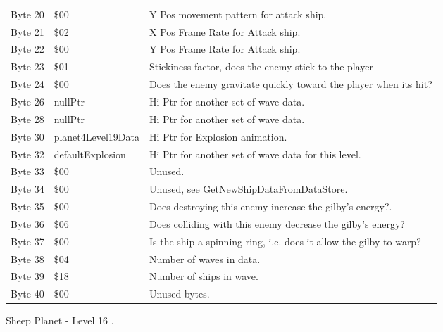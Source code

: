\begin{figure}[H]
{\begin{adjustbox}{width=12cm}
\begin{tabular}{lll}
 Byte 20 & \$00                & Y Pos movement pattern for attack ship.                            \\
 Byte 21 & \$02                & X Pos Frame Rate for Attack ship.                                  \\
 Byte 22 & \$00                & Y Pos Frame Rate for Attack ship.                                  \\
 Byte 23 & \$01                & Stickiness factor, does the enemy stick to the player              \\
 Byte 24 & \$00                & Does the enemy gravitate quickly toward the player when its hit?   \\
 Byte 26 & nullPtr            & Hi Ptr for another set of wave data.                               \\
 Byte 28 & nullPtr            & Hi Ptr for another set of wave data.                               \\
 Byte 30 & planet4Level19Data & Hi Ptr for Explosion animation.                                    \\
 Byte 32 & defaultExplosion   & Hi Ptr for another set of wave data for this level.                \\
 Byte 33 & \$00                & Unused.                                                            \\
 Byte 34 & \$00                & Unused, see GetNewShipDataFromDataStore.                           \\
 Byte 35 & \$00                & Does destroying this enemy increase the gilby's energy?.           \\
 Byte 36 & \$06                & Does colliding with this enemy decrease the gilby's energy?        \\
 Byte 37 & \$00                & Is the ship a spinning ring, i.e. does it allow the gilby to warp? \\
 Byte 38 & \$04                & Number of waves in data.                                           \\
 Byte 39 & \$18                & Number of ships in wave.                                           \\
 Byte 40 & \$00                & Unused bytes.                                                      \\
\bottomrule
\end{tabular}

  \end{adjustbox}

  }\caption*{Sheep Planet - Level 16
.}
\end{figure}

